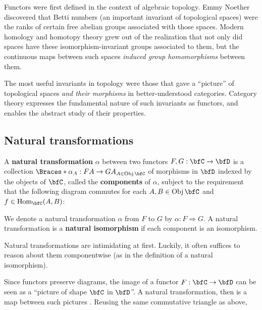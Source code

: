 \documentclass[a5paper]{article}
\begin{document}
\begin{remark*}
  Functors were first defined in the context of algebraic topology. Emmy Noether
  discovered that Betti numbers (an important invariant of topological spaces)
  were the ranks of certain free abelian groups associated with those spaces. 
  Modern homology and homotopy theory grew out of the realization
  that not only did spaces have these isomorphism-invariant groups associated to
  them, but the continuous maps between such spaces \textit{induced group
  homomorphisms} between them.

  The most useful invariants in topology were those that gave a ``picture'' of
  topological spaces \textit{and their morphisms} in better-understood categories.
  Category theory expresses the fundamental nature of such invariants as
  functors, and enables the abstract study of their properties.
\end{remark*}

\subsection{Natural transformations}

\begin{definition*}
	A \textbf{natural transformation} $\alpha$ between two functors
  $F,G:\bfC\to\bfD$ is a collection $\braces{\alpha_A:FA\to GA}_{A\in \Obj\bfC}$
  of morphisms in $\bfD$ indexed by the objects of $\bfC$, called the
  \textbf{components} of $\alpha$, subject to the requirement that the following
  diagram commutes for each $A,B\in\Obj \bfC$ and $f\in\Hom_{\bfC}(A,B)$:
  \begin{center}
  \end{center}
  \noindent We denote a natural transformation $\alpha$ from $F$ to $G$ by
  $\alpha: F\Rightarrow G$. A natural transformation is a
  \textbf{natural isomorphism} if each component is an isomorphism.
\end{definition*}

Natural transformations are intimidating at first. Luckily, it often suffices to
reason about them componentwise (as in the definition of a natural isomorphism).

Since functors preserve diagrams, the image of a functor $F:\bfC\to\bfD$ can be
seen as a ``picture of shape $\bfC$ in $\bfD$''. A natural transformation, then
is a map between such pictures \cite[pp.\ 16]{maclane}. Reusing the same
commutative triangle as above,
\end{document}
